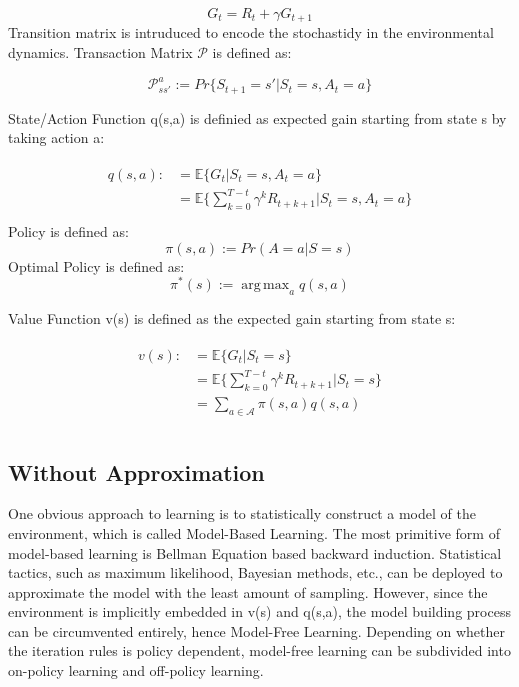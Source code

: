 \documentclass[journal]{IEEEtran}
\DeclareMathOperator*{\argmax}{arg\,max}  %
\begin{document}
\begin{equation}
        G_{t}=R_{t}+\gamma G_{t+1}
    \label{bellman}
\end{equation}
Transition matrix is intruduced to encode the stochastidy in the environmental dynamics. Transaction Matrix $\mathcal{P}$ is defined as:

\begin{equation}
    \mathcal{P}_{ss'}^a := Pr\{S_{t+1}=s'|S_{t}=s,A_{t}=a\}
\end{equation}


State/Action Function q(s,a) is definied as expected gain starting from state s by taking action a:

\begin{align}
\begin{split}
    q(s,a) :&= \mathbb{E}\{G_t|S_t=s,A_t=a\}\\
    &=\mathbb{E} \{\sum_{k=0}^{T-t} \gamma ^k R_{t+k+1}| S_t=s,A_t=a\}\\
\end{split}
\end{align}
Policy is defined as:
\begin{equation}
    \pi(s,a):=Pr(A=a|S=s)
\end{equation}
Optimal Policy is defined as:
\begin{equation}
    \pi^*(s):=\argmax_a q(s,a)
\end{equation}


Value Function v(s) is defined as the expected gain starting from state s:

\begin{align}
\begin{split}
    v(s) :&=  \mathbb{E}\{G_t|S_t=s\}\\
    &=\mathbb{E} \{\sum_{k=0}^{T-t} \gamma ^k R_{t+k+1}| S_t=s\}\\
    &=\sum_{a \in \mathcal{A}} \pi(s,a) q(s,a)\\
\end{split}
\end{align}

\subsection{Without Approximation}
One obvious approach to learning is to statistically construct a model of the environment, which is called Model-Based Learning. The most primitive form of model-based learning is Bellman Equation based backward induction. Statistical tactics, such as maximum likelihood, Bayesian methods, etc., can be deployed to approximate the model with the least amount of sampling. However, since the environment is implicitly embedded in v(s) and q(s,a), the model building process can be circumvented entirely, hence Model-Free Learning. Depending on whether the iteration rules is policy dependent, model-free learning can be subdivided into on-policy learning and off-policy learning.
\end{document}
